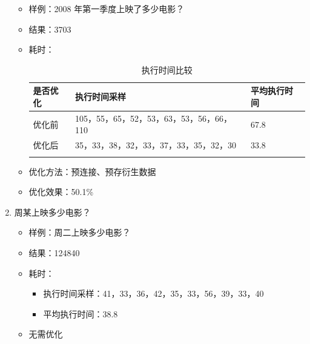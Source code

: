 \documentclass{ctexrep}
\begin{document}
\begin{enumerate}
\begin{itemize}
    	            \item 样例：2008 年第一季度上映了多少电影？
    	            \item 结果：3703
    	            \item 耗时：
    	                \begin{longtable}{l|p{5cm}|l}
    	                    \hline
    	                    是否优化 & 执行时间采样 & 平均执行时间\\
    	                    \hline
    	                    \hline
    	                    优化前 & 105，55，65，52，53，63，53，56，66，110 & 67.8\\
    	                    优化后 & 35，33，38，32，33，37，33，35，32，30 & 33.8\\
    	                    \hline
    	                    \caption{执行时间比较}
    	                \end{longtable}
    	            \item 优化方法：预连接、预存衍生数据
    	            \item 优化效果：50.1\%
    	        \end{itemize}
    	    \item 周某上映多少电影？
    	        \begin{itemize}
    	            \item 样例：周二上映多少电影？
    	            \item 结果：124840
    	            \item 耗时：
    	                \begin{itemize}
    	                    \item 执行时间采样：41，33，36，42，35，33，56，39，33，40
    	                    \item 平均执行时间：38.8
    	                \end{itemize}
    	            \item 无需优化
    	        \end{itemize}
	    \end{enumerate}
\end{document}
